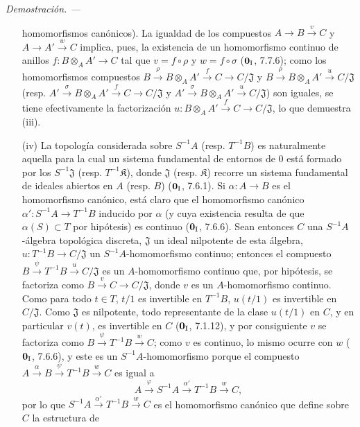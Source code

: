 \documentclass[10pt,oneside]{book}
\newenvironment{proof}{%
  \par\medskip\noindent\textit{Demostración. ---\ }}{\par}
\begin{document}
\begin{proof}
\begin{enumerate}
  homomorfismos canónicos). La igualdad de los compuestos $A\to B\xrightarrow{v}C$ y
  $A\to A'\xrightarrow{w}C$ implica, pues, la existencia de un homomorfismo
  continuo de anillos $f:B\otimes_A A'\to C$ tal que
  $v=f\circ\rho$ y $w=f\circ\sigma$ ($\mathbf 0_{\rm I}$, 7.7.6);
  como los homomorfismos compuestos
  $B\xrightarrow{\rho}B\otimes_A A'\xrightarrow{f}C\to C/\mathfrak J$
  y
  $B\xrightarrow{\rho}B\otimes_A A'\xrightarrow{u}C/\mathfrak J$
  (resp.
  $A'\xrightarrow{\sigma}B\otimes_A A'\xrightarrow{f}C\to C/\mathfrak J$
  y
  $A'\xrightarrow{\sigma}B\otimes_A A'\xrightarrow{u}C/\mathfrak J$)
  son iguales, se tiene efectivamente la factorización
  $u:B\otimes_A A'\xrightarrow{f}C\to C/\mathfrak J$, lo que demuestra
  (iii).
  \item[(iv)] La topología considerada sobre $S^{-1}A$ (resp. $T^{-1}B$) es
  naturalmente aquella para la cual un sistema fundamental de entornos de
  $0$ está formado por los $S^{-1}\mathfrak J$ (resp. $T^{-1}\mathfrak K$), donde
  $\mathfrak J$ (resp. $\mathfrak K$) recorre un sistema fundamental
  de ideales abiertos en $A$ (resp. $B$) ($\mathbf 0_{\rm I}$, 7.6.1). Si
  $\alpha:A\to B$ es el homomorfismo canónico, está claro que
  el homomorfismo canónico $\alpha':S^{-1}A\to T^{-1}B$ inducido por
  $\alpha$ (y cuya existencia resulta de que $\alpha(S)\subset T$ por
  hipótesis) es continuo ($\mathbf 0_{\rm I}$, 7.6.6). Sean entonces $C$ una $S^{-1}A$-álgebra topológica
  discreta, $\mathfrak J$ un ideal nilpotente de esta álgebra,
  $u:T^{-1}B\to C/\mathfrak J$ un $S^{-1}A$-homomorfismo continuo; entonces
  el compuesto $B\xrightarrow{\psi}T^{-1}B\xrightarrow{u}C/\mathfrak J$ es un
  $A$-homomorfismo continuo que, por hipótesis, se factoriza como
  $B\xrightarrow{v}C\to C/\mathfrak J$, donde $v$ es un $A$-homomorfismo
  continuo. Como para todo $t\in T$, $t/1$ es invertible en $T^{-1}B$,
  $u(t/1)$ es invertible en $C/\mathfrak J$. Como $\mathfrak J$ es
  nilpotente, todo representante de la clase $u(t/1)$ en $C$, y en particular
  $v(t)$, es invertible en $C$ ($\mathbf 0_{\rm I}$, 7.1.12), y por consiguiente
  $v$ se factoriza como $B\xrightarrow{\psi}T^{-1}B\xrightarrow{w}C$; como $v$ es
  continuo, lo mismo ocurre con $w$ ($\mathbf 0_{\rm I}$, 7.6.6), y este es
  un $S^{-1}A$-homomorfismo porque el compuesto
  $A\xrightarrow{\alpha}B\xrightarrow{\psi}T^{-1}B\xrightarrow{w}C$ es igual a
  \[
    A\xrightarrow{\varphi}S^{-1}A\xrightarrow{\alpha'}T^{-1}B\xrightarrow{w}C,
  \]
  por lo que $S^{-1}A\xrightarrow{\alpha'}T^{-1}B\xrightarrow{w}C$ es
  el homomorfismo canónico que define sobre $C$ la estructura de

\end{enumerate}
\end{proof}
\end{document}
